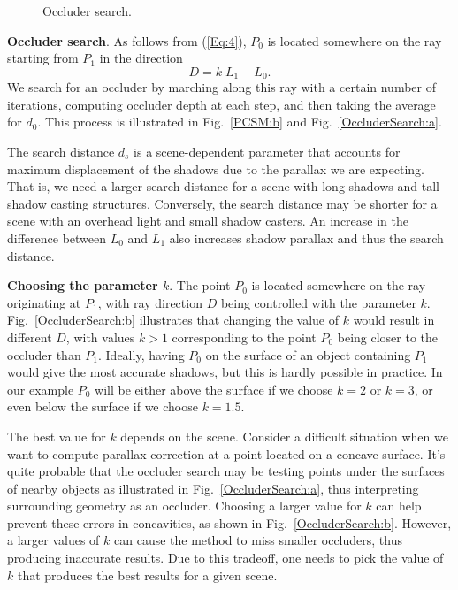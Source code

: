 \begin{figure}[t]
\hfill
{}
\caption{\small Occluder search.}
\label{Fig:OccluderSearch}
\end{figure}

\bigskip
\textbf{Occluder search}. As follows from (\ref{Eq:4}), $P_0$ is located 
somewhere on the ray starting from $P_1$ in the direction 
\begin{equation}\label{Eq:5}
D = k\;L_1 - L_0.
\end{equation}
We search for an occluder by marching along this ray with a certain number
of iterations, computing occluder depth at each step, and then taking the average
for $d_0$. This process is illustrated in Fig.~\ref{PCSM:b} and 
Fig.~\ref{OccluderSearch:a}.

The search distance $d_s$ is a scene-dependent parameter that accounts for 
maximum displacement of the shadows due to the parallax we are expecting.
That is, we need a larger search distance for a scene with long shadows 
and tall shadow casting structures. Conversely, the search distance may 
be shorter for a scene with an overhead light and small shadow casters.
An increase in the difference between $L_0$ and $L_1$ also increases shadow
parallax and thus the search distance.

\bigskip
\textbf{Choosing the parameter $k$}. The point 
$P_0$ is located somewhere on the ray originating at $P_1$, with ray direction 
$D$ being controlled with the parameter $k$. Fig.~\ref{OccluderSearch:b} 
illustrates that changing the value of $k$ would result in different $D$, 
with values $k > 1$ corresponding to the point $P_0$ being closer to the occluder 
than $P_1$. Ideally, having $P_0$ on the surface of an object containing $P_1$ 
would give the most accurate shadows, but this is hardly possible in practice.
In our example $P_0$ will be either above the surface if we choose $k = 2$ 
or $k = 3$, or even below the surface if we choose $k = 1.5$.

The best value for $k$ depends on the scene. 
Consider a difficult situation when we want to compute parallax correction at
a point located on a concave surface. It's quite probable that the occluder search 
may be testing points under the surfaces of nearby objects as illustrated in 
Fig.~\ref{OccluderSearch:a}, thus interpreting surrounding geometry as an 
occluder.
Choosing a larger value for $k$ can help prevent these errors in concavities, as shown in 
Fig.~\ref{OccluderSearch:b}. However, a larger values of $k$ can cause the method 
to miss smaller occluders, thus producing inaccurate results. Due to this tradeoff, one needs
to pick the value of $k$ that produces the best results for a given scene.


